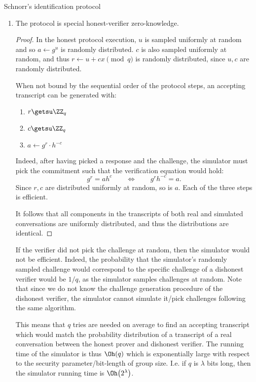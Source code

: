 \documentclass{practice}
\begin{document}
\begin{task}{Schnorr's identification protocol}
\begin{enumerate}
    \item The protocol is special honest-verifier zero-knowledge.
    
    \begin{proof}
      In the honest protocol execution, $u$ is sampled uniformly at random and so $a \gets g^u$ is randomly distributed.
      $c$ is also sampled uniformly at random, and thus $r \gets u + cx \pmod{q}$ is randomly distributed, since $u, c$ are randomly distributed.

      When not bound by the sequential order of the protocol steps, an accepting transcript can be generated with:
      \begin{enumerate}
        \item $r \getsu \ZZ_q$
        \item $c \getsu \ZZ_q$
        \item $a \gets g^r\cdot h^{-c}$
      \end{enumerate}

      Indeed, after having picked a response and the challenge, the simulator must pick the commitment such that the verification equation would hold:
      \[
        g^r = ah^c
        \qquad\iff\qquad
        g^r h^{-c} = a.
      \]
      Since $r, c$ are distributed uniformly at random, so is $a$.
      Each of the three steps is efficient.

      It follows that all components in the transcripts of both real and simulated conversations are uniformly distributed, and thus the distributions are identical.
    \end{proof}

    If the verifier did not pick the challenge at random, then the simulator would not be efficient.
    Indeed, the probability that the simulator's randomly sampled challenge would correspond to the specific challenge of a dishonest verifier would be $1/q$, as the simulator samples challenges at random.
    Note that since we do not know the challenge generation procedure of the dishonest verifier, the simulator cannot simulate it/pick challenges following the same algorithm.

    This means that $q$ tries are needed on average to find an accepting transcript which would match the probability distribution of a transcript of a real conversation between the honest prover and dishonest verifier.
    The running time of the simulator is thus $\Oh(q)$ which is exponentially large with respect to the security parameter/bit-length of group size.
    I.e. if $q$ is $\lambda$ bits long, then the simulator running time is $\Oh\bigl(2^\lambda\bigr)$.
  \end{enumerate}
\end{task}
\end{document}
